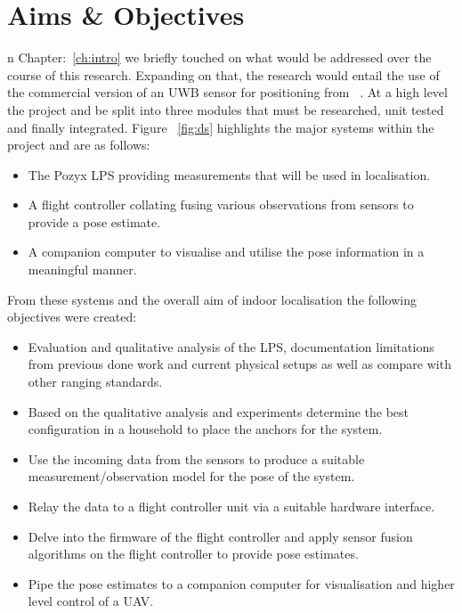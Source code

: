 \let\textcircled=\pgftextcircled
\chapter{Aims \& Objectives}\label{ch:aims_objs}

    n Chapter:~\ref{ch:intro} we briefly touched on what would be addressed over the course of this research.
Expanding on that, the research would entail the use of the commercial version of an UWB sensor for positioning from ~\cite{pozyx2018pozyx}.
At a high level the project and be split into three modules that must be researched, unit tested and finally integrated.
Figure ~\ref{fig:ds} highlights the major systems within the project and are as follows:
\begin{itemize}
    \item The Pozyx LPS providing measurements that will be used in localisation.
    \item A flight controller collating fusing various observations from sensors to provide a pose estimate.
    \item A companion computer to visualise and utilise the pose information in a meaningful manner.
\end{itemize}

From these systems and the overall aim of indoor localisation the following objectives were created:
\begin{itemize}
    \item Evaluation and qualitative analysis of the LPS, documentation limitations from previous done work and current physical setups as well as compare with other ranging standards.
    \item Based on the qualitative analysis and experiments determine the best configuration in a household to place the anchors for the system.
    \item Use the incoming data from the sensors to produce a suitable measurement/observation model for the pose of the system.
    \item Relay the data to a flight controller unit via a suitable hardware interface.
    \item Delve into the firmware of the flight controller and apply sensor fusion algorithms on the flight controller to provide pose estimates.
    \item Pipe the pose estimates to a companion computer for visualisation and higher level control of a UAV.
\end{itemize}

